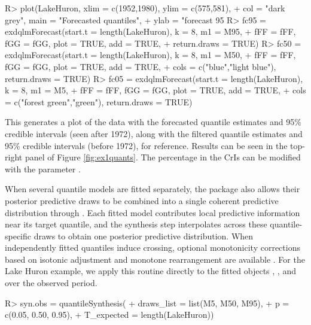 \documentclass[jss]{jss}
\begin{document}
\begin{CodeChunk}
\begin{CodeInput}
R> plot(LakeHuron,  xlim = c(1952,1980), ylim = c(575,581),
+        col = "dark grey", main = "Forecasted quantiles",
+           ylab = "forecast 95%
R> fc95 = exdqlmForecast(start.t = length(LakeHuron), k = 8, m1 = M95,
+               fFF = fFF, fGG = fGG, plot = TRUE, add = TRUE,
+               return.draws = TRUE)
R> fc50 = exdqlmForecast(start.t = length(LakeHuron), k = 8, m1 = M50,
+               fFF = fFF, fGG = fGG, plot = TRUE, add = TRUE,
+               cols = c("blue","light blue"), return.draws = TRUE)
R> fc05 = exdqlmForecast(start.t = length(LakeHuron), k = 8, m1 = M5,
+               fFF = fFF, fGG = fGG, plot = TRUE, add = TRUE,
+               cols = c("forest green","green"), return.draws = TRUE)
\end{CodeInput}
\end{CodeChunk}

This generates a plot of the data with the forecasted quantile estimates and 95\% credible intervals (seen after 1972), along with the filtered quantile estimates and 95\% credible intervals (before 1972), for reference. Results can be seen in the top-right panel of Figure \ref{fig:ex1quants}. The percentage in the CrIs can be modified with the parameter .

When several quantile models are fitted separately, the package also allows their posterior predictive draws to be combined into a single coherent predictive distribution through . Each fitted model contributes local predictive information near its target quantile, and the synthesis step interpolates across these quantile-specific draws to obtain one posterior predictive distribution. When independently fitted quantiles induce crossing, optional monotonicity corrections based on isotonic adjustment and monotone rearrangement are available \citep{barlow1972,chernozhukov2010}. For the Lake Huron example, we apply this routine directly to the fitted objects , , and  over the observed period.

\begin{CodeChunk}
\begin{CodeInput}
R> syn.obs = quantileSynthesis(
+               draws_list = list(M5, M50, M95),
+               p = c(0.05, 0.50, 0.95),
+               T_expected = length(LakeHuron))
\end{CodeInput}
\end{CodeChunk}
\end{document}
